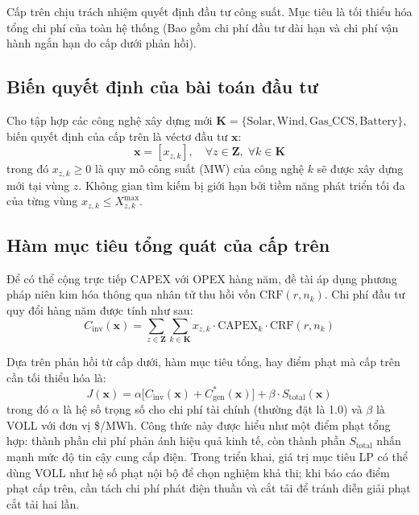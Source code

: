 Cấp trên chịu trách nhiệm quyết định đầu tư công suất. Mục tiêu là tối thiểu hóa tổng chi phí của toàn hệ thống (Bao gồm chi phí đầu tư dài hạn và chi phí vận hành ngắn hạn do cấp dưới phản hồi).

\subsection{Biến quyết định của bài toán đầu tư}

Cho tập hợp các công nghệ xây dựng mới $\mathbf{K} = \{ \text{Solar}, \text{Wind}, \text{Gas\_CCS}, \text{Battery} \}$, biến quyết định của cấp trên là véctơ đầu tư $\mathbf{x}$:
\begin{equation}
    \mathbf{x} = [x_{z,k}], \quad \forall z \in \mathbf{Z}, \; \forall k \in \mathbf{K}
\end{equation}
trong đó $x_{z,k} \ge 0$ là quy mô công suất (MW) của công nghệ $k$ sẽ được xây dựng mới tại vùng $z$. Không gian tìm kiếm bị giới hạn bởi tiềm năng phát triển tối đa của từng vùng $x_{z,k} \le X_{z,k}^{\max}$.

\subsection{Hàm mục tiêu tổng quát của cấp trên}

Để có thể cộng trực tiếp CAPEX với OPEX hàng năm, đề tài áp dụng phương pháp niên kim hóa thông qua nhân tử thu hồi vốn $\text{CRF}(r, n_k)$. Chi phí đầu tư quy đổi hàng năm được tính như sau:
\begin{equation}
    C_{\text{inv}}(\mathbf{x}) = \sum_{z \in \mathbf{Z}} \sum_{k \in \mathbf{K}} x_{z,k} \cdot \text{CAPEX}_k \cdot \text{CRF}(r, n_k)
\end{equation}

Dựa trên phản hồi từ cấp dưới, hàm mục tiêu tổng, hay điểm phạt mà cấp trên cần tối thiểu hóa là:
\begin{equation}
    J(\mathbf{x}) = \alpha \Big[ C_{\text{inv}}(\mathbf{x}) + C_{\text{gen}}^*(\mathbf{x}) \Big] + \beta \cdot S_{\text{total}}(\mathbf{x})
    \label{eq:upper_objective}
\end{equation}
trong đó $\alpha$ là hệ số trọng số cho chi phí tài chính (thường đặt là 1.0) và $\beta$ là VOLL với đơn vị \$/MWh. Công thức này được hiểu như một điểm phạt tổng hợp: thành phần chi phí phản ánh hiệu quả kinh tế, còn thành phần $S_{\text{total}}$ nhấn mạnh mức độ tin cậy cung cấp điện. Trong triển khai, giá trị mục tiêu LP có thể dùng VOLL như hệ số phạt nội bộ để chọn nghiệm khả thi; khi báo cáo điểm phạt cấp trên, cần tách chi phí phát điện thuần và cắt tải để tránh diễn giải phạt cắt tải hai lần.

